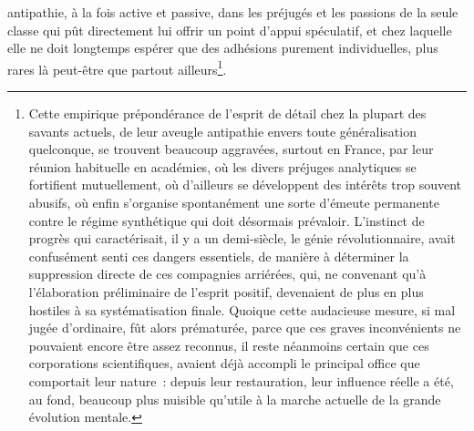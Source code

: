 \documentclass[french,twoside]{book} %
\begin{document}
antipathie, à la fois active et passive, dans les préjugés et les passions de la seule classe qui pût directement lui offrir un point d’appui spéculatif, et chez laquelle elle ne doit longtemps espérer que des adhésions purement individuelles, plus rares là peut-être que partout ailleurs\footnote{ Cette empirique prépondérance de l’esprit de détail chez la plupart des savants actuels, de leur aveugle antipathie envers toute généralisation quelconque, se trouvent beaucoup aggravées, surtout en France, par leur réunion habituelle en académies, où les divers préjuges analytiques se fortifient mutuellement, où d’ailleurs se développent des intérêts trop souvent abusifs, où enfin s’organise spontanément une sorte d’émeute permanente contre le régime synthétique qui doit désormais prévaloir. L’instinct de progrès qui caractérisait, il y a un demi-siècle, le génie révolutionnaire, avait confusément senti ces dangers essentiels, de manière à déterminer la suppression directe de ces compagnies arriérées, qui, ne convenant qu’à l’élaboration préliminaire de l’esprit positif, devenaient de plus en plus hostiles à sa systématisation finale. Quoique cette audacieuse mesure, si mal jugée d’ordinaire, fût alors prématurée, parce que ces graves inconvénients ne pouvaient encore être assez reconnus, il reste néanmoins certain que ces corporations scientifiques, avaient déjà accompli le principal office que comportait leur nature : depuis leur restauration, leur influence réelle a été, au fond, beaucoup plus nuisible qu’utile à la marche actuelle de la grande évolution mentale.}.\par
\end{document}
